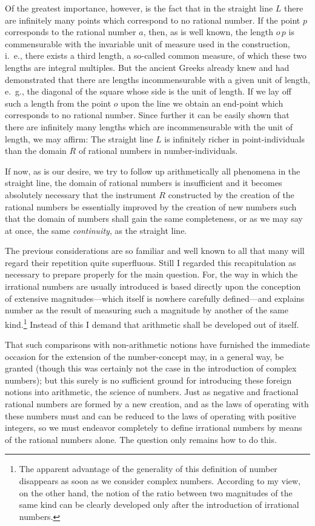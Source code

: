 \documentclass[polutonikogreek,english,twoside,openright]{article}
\begin{document}
Of the greatest importance, however, is the fact that in the straight
line $L$ there are infinitely many points which correspond to no
rational number. If the point $p$ corresponds to the rational number
$a$, then, as is well known, the length $o\,p$ is commensurable with
the invariable unit of measure used in the construction, i.~e., there
exists a third length, a so-called common measure, of which these two
lengths are integral multiples. But the ancient Greeks already knew
and had demonstrated that there are lengths incommensurable with a
given unit of length, e.~g., the diagonal of the square whose side is
the unit of length.  If we lay off such a length from the point $o$
upon the line we obtain an end-point which corresponds to no rational
number. Since further it can be easily shown that there are infinitely
many lengths which are incommensurable with the unit of length, we may
affirm: The straight line $L$ is infinitely richer in
point-individuals than the domain $R$ of rational numbers in
number-individuals.

If now, as is our desire, we try to follow up arithmetically all
phenomena in the straight line, the domain of rational numbers is
insufficient and it becomes absolutely necessary that the instrument
$R$ constructed by the creation of the rational numbers be essentially
improved by the creation of new numbers such that the domain of
numbers shall gain the same completeness, or as we may say at once,
the same \textit{continuity}, as the straight line.

The previous considerations are so familiar and well known to all that
many will regard their repetition quite superfluous. Still I regarded
this recapitulation as necessary to prepare properly for the main
question. For, the way in which the irrational numbers are usually
introduced is based directly upon the conception of extensive
magnitudes---which itself is nowhere carefully defined---and explains
number as the result of measuring such a magnitude by another of the
same kind.\footnote{The apparent advantage of the generality of this
  definition of number disappears as soon as we consider complex
  numbers. According to my view, on the other hand, the notion of the
  ratio between two magnitudes of the same kind can be clearly
  developed only after the introduction of irrational numbers.}
Instead of this I demand that arithmetic shall be developed out of
itself.

That such comparisons with non-arithmetic notions have furnished the
immediate occasion for the extension of the number-concept may, in a
general way, be granted (though this was certainly not the case in the
introduction of complex numbers); but this surely is no sufficient
ground for introducing these foreign notions into arithmetic, the
science of numbers. Just as negative and fractional rational numbers
are formed by a new creation, and as the laws of operating with these
numbers must and can be reduced to the laws of operating with positive
integers, so we must endeavor completely to define irrational numbers
by means of the rational numbers alone. The question only remains how
to do this.
\end{document}
